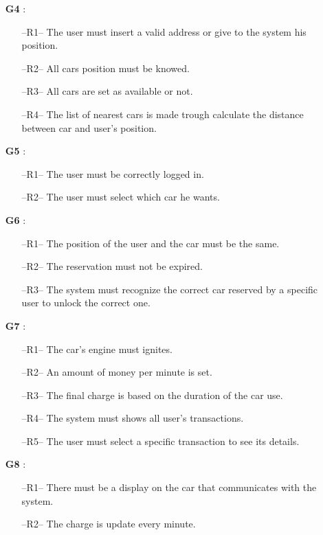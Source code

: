 \begin{itemize}
\item[\textbf{G4}]:
\begin{itemize}
\item[--R1--] The user must insert a valid address or give to the system his position.
\item[--R2--] All cars position must be knowed.
\item[--R3--] All cars are set as available or not.
\item[--R4--] The list of nearest cars is made trough calculate the distance between car and user's position.
\end{itemize}

\item[\textbf{G5}]:
\begin{itemize}
\item[--R1--] The user must be correctly logged in.
\item[--R2--] The user must select which car he wants.
\end{itemize}

\item[\textbf{G6}]:
\begin{itemize}
\item[--R1--] The position of the user and the car must be the same.
\item[--R2--] The reservation must not be expired.
\item[--R3--] The system must recognize the correct car reserved by a specific user to unlock the correct one.
\end{itemize}

\item[\textbf{G7}]:
\begin{itemize}
\item[--R1--] The car's engine must ignites.
\item[--R2--] An amount of money per minute is set.
\item[--R3--] The final charge is based on the duration of the car use.
\item[--R4--] The system must shows all user's transactions.
\item[--R5--] The user must select a specific transaction to see its details.
\end{itemize}

\item[\textbf{G8}]:
\begin{itemize}
\item[--R1--] There must be a display on the car that communicates with the system.
\item[--R2--] The charge is update every minute.
\end{itemize}


\end{itemize}
